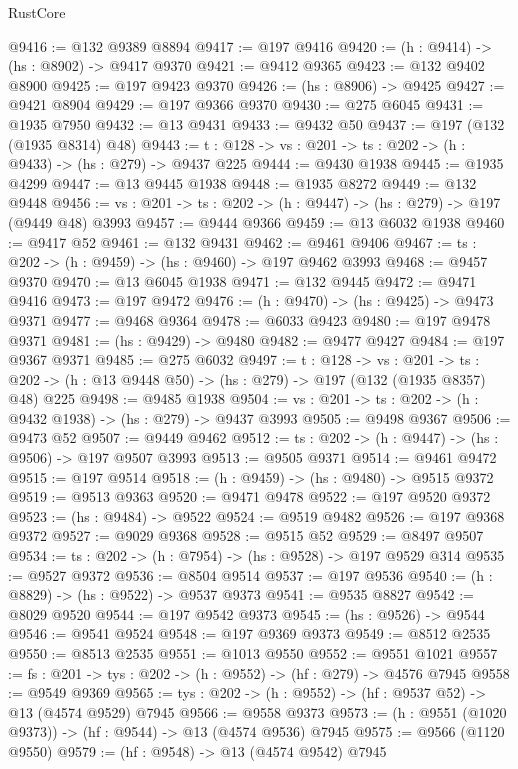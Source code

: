 \begin{lexlean}{RustCore}
\begin{coremodule}
@9416 := @132 @9389 @8894
@9417 := @197 @9416
@9420 := (h : @9414) -> (hs : @8902) -> @9417 @9370
@9421 := @9412 @9365
@9423 := @132 @9402 @8900
@9425 := @197 @9423 @9370
@9426 := (hs : @8906) -> @9425
@9427 := @9421 @8904
@9429 := @197 @9366 @9370
@9430 := @275 @6045
@9431 := @1935 @7950
@9432 := @13 @9431
@9433 := @9432 @50
@9437 := @197 (@132 (@1935 @8314) @48)
@9443 := {t : @128} -> {vs : @201} -> {ts : @202} -> (h : @9433) -> (hs : @279) -> @9437 @225
@9444 := @9430 @1938
@9445 := @1935 @4299
@9447 := @13 @9445 @1938
@9448 := @1935 @8272
@9449 := @132 @9448
@9456 := {vs : @201} -> {ts : @202} -> (h : @9447) -> (hs : @279) -> @197 (@9449 @48) @3993
@9457 := @9444 @9366
@9459 := @13 @6032 @1938
@9460 := @9417 @52
@9461 := @132 @9431
@9462 := @9461 @9406
@9467 := {ts : @202} -> (h : @9459) -> (hs : @9460) -> @197 @9462 @3993
@9468 := @9457 @9370
@9470 := @13 @6045 @1938
@9471 := @132 @9445
@9472 := @9471 @9416
@9473 := @197 @9472
@9476 := (h : @9470) -> (hs : @9425) -> @9473 @9371
@9477 := @9468 @9364
@9478 := @6033 @9423
@9480 := @197 @9478 @9371
@9481 := (hs : @9429) -> @9480
@9482 := @9477 @9427
@9484 := @197 @9367 @9371
@9485 := @275 @6032
@9497 := {t : @128} ->
  {vs : @201} ->
  {ts : @202} -> (h : @13 @9448 @50) -> (hs : @279) -> @197 (@132 (@1935 @8357) @48) @225
@9498 := @9485 @1938
@9504 := {vs : @201} -> {ts : @202} -> (h : @9432 @1938) -> (hs : @279) -> @9437 @3993
@9505 := @9498 @9367
@9506 := @9473 @52
@9507 := @9449 @9462
@9512 := {ts : @202} -> (h : @9447) -> (hs : @9506) -> @197 @9507 @3993
@9513 := @9505 @9371
@9514 := @9461 @9472
@9515 := @197 @9514
@9518 := (h : @9459) -> (hs : @9480) -> @9515 @9372
@9519 := @9513 @9363
@9520 := @9471 @9478
@9522 := @197 @9520 @9372
@9523 := (hs : @9484) -> @9522
@9524 := @9519 @9482
@9526 := @197 @9368 @9372
@9527 := @9029 @9368
@9528 := @9515 @52
@9529 := @8497 @9507
@9534 := {ts : @202} -> (h : @7954) -> (hs : @9528) -> @197 @9529 @314
@9535 := @9527 @9372
@9536 := @8504 @9514
@9537 := @197 @9536
@9540 := (h : @8829) -> (hs : @9522) -> @9537 @9373
@9541 := @9535 @8827
@9542 := @8029 @9520
@9544 := @197 @9542 @9373
@9545 := (hs : @9526) -> @9544
@9546 := @9541 @9524
@9548 := @197 @9369 @9373
@9549 := @8512 @2535
@9550 := @8513 @2535
@9551 := @1013 @9550
@9552 := @9551 @1021
@9557 := {fs : @201} -> {tys : @202} -> (h : @9552) -> (hf : @279) -> @4576 @7945
@9558 := @9549 @9369
@9565 := {tys : @202} -> (h : @9552) -> (hf : @9537 @52) -> @13 (@4574 @9529) @7945
@9566 := @9558 @9373
@9573 := (h : @9551 (@1020 @9373)) -> (hf : @9544) -> @13 (@4574 @9536) @7945
@9575 := @9566 (@1120 @9550)
@9579 := (hf : @9548) -> @13 (@4574 @9542) @7945

\end{coremodule}
\end{lexlean}
